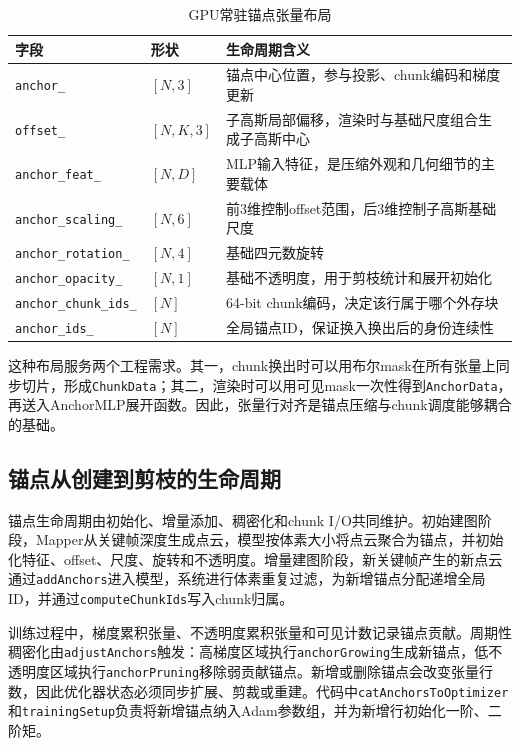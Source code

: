 \begin{table}[htbp]
\centering
\caption{GPU常驻锚点张量布局}
\label{tab:anchor_tensor_layout}
\begin{tabular}{p{3.5cm}p{2.6cm}p{6.4cm}}
\toprule
\textbf{字段} & \textbf{形状} & \textbf{生命周期含义} \\
\midrule
\texttt{anchor\_} & $[N,3]$ & 锚点中心位置，参与投影、chunk编码和梯度更新 \\
\texttt{offset\_} & $[N,K,3]$ & 子高斯局部偏移，渲染时与基础尺度组合生成子高斯中心 \\
\texttt{anchor\_feat\_} & $[N,D]$ & MLP输入特征，是压缩外观和几何细节的主要载体 \\
\texttt{anchor\_scaling\_} & $[N,6]$ & 前3维控制offset范围，后3维控制子高斯基础尺度 \\
\texttt{anchor\_rotation\_} & $[N,4]$ & 基础四元数旋转 \\
\texttt{anchor\_opacity\_} & $[N,1]$ & 基础不透明度，用于剪枝统计和展开初始化 \\
\texttt{anchor\_chunk\_ids\_} & $[N]$ & 64-bit chunk编码，决定该行属于哪个外存块 \\
\texttt{anchor\_ids\_} & $[N]$ & 全局锚点ID，保证换入换出后的身份连续性 \\
\bottomrule
\end{tabular}
\end{table}

这种布局服务两个工程需求。其一，chunk换出时可以用布尔mask在所有张量上同步切片，形成\texttt{ChunkData}；其二，渲染时可以用可见mask一次性得到\texttt{AnchorData}，再送入AnchorMLP展开函数。因此，张量行对齐是锚点压缩与chunk调度能够耦合的基础。

\subsection{锚点从创建到剪枝的生命周期}

锚点生命周期由初始化、增量添加、稠密化和chunk I/O共同维护。初始建图阶段，Mapper从关键帧深度生成点云，模型按体素大小将点云聚合为锚点，并初始化特征、offset、尺度、旋转和不透明度。增量建图阶段，新关键帧产生的新点云通过\texttt{addAnchors}进入模型，系统进行体素重复过滤，为新增锚点分配递增全局ID，并通过\texttt{computeChunkIds}写入chunk归属。

训练过程中，梯度累积张量、不透明度累积张量和可见计数记录锚点贡献。周期性稠密化由\texttt{adjustAnchors}触发：高梯度区域执行\texttt{anchorGrowing}生成新锚点，低不透明度区域执行\texttt{anchorPruning}移除弱贡献锚点。新增或删除锚点会改变张量行数，因此优化器状态必须同步扩展、剪裁或重建。代码中\texttt{catAnchorsToOptimizer}和\texttt{trainingSetup}负责将新增锚点纳入Adam参数组，并为新增行初始化一阶、二阶矩。

